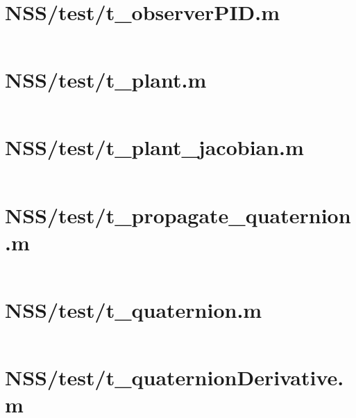 \pagebreak
\section*{NSS/test/t\_observerPID.m}\label{code:NSS/test/t_observerPID.m}
\inputminted[linenos,fontsize=\scriptsize]{matlab}{/home/dcouture/git/mathyourlife/TSatPy/beta_versions/matlab_object_oriented/test/t_observerPID.m}

\pagebreak
\section*{NSS/test/t\_plant.m}\label{code:NSS/test/t_plant.m}
\inputminted[linenos,fontsize=\scriptsize]{matlab}{/home/dcouture/git/mathyourlife/TSatPy/beta_versions/matlab_object_oriented/test/t_plant.m}

\pagebreak
\section*{NSS/test/t\_plant\_jacobian.m}\label{code:NSS/test/t_plant_jacobian.m}
\inputminted[linenos,fontsize=\scriptsize]{matlab}{/home/dcouture/git/mathyourlife/TSatPy/beta_versions/matlab_object_oriented/test/t_plant_jacobian.m}

\pagebreak
\section*{NSS/test/t\_propagate\_quaternion.m}\label{code:NSS/test/t_propagate_quaternion.m}
\inputminted[linenos,fontsize=\scriptsize]{matlab}{/home/dcouture/git/mathyourlife/TSatPy/beta_versions/matlab_object_oriented/test/t_propagate_quaternion.m}

\pagebreak
\section*{NSS/test/t\_quaternion.m}\label{code:NSS/test/t_quaternion.m}
\inputminted[linenos,fontsize=\scriptsize]{matlab}{/home/dcouture/git/mathyourlife/TSatPy/beta_versions/matlab_object_oriented/test/t_quaternion.m}

\pagebreak
\section*{NSS/test/t\_quaternionDerivative.m}\label{code:NSS/test/t_quaternionDerivative.m}
\inputminted[linenos,fontsize=\scriptsize]{matlab}{/home/dcouture/git/mathyourlife/TSatPy/beta_versions/matlab_object_oriented/test/t_quaternionDerivative.m}

